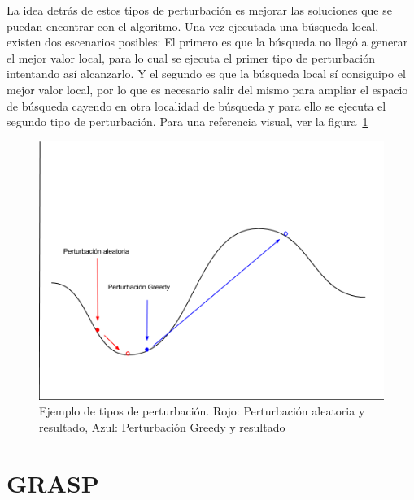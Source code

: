 \documentclass{ci5652}
\begin{document}
La idea detrás de estos tipos de perturbación es mejorar las soluciones que se puedan encontrar con el algoritmo. Una vez ejecutada una búsqueda local, existen dos escenarios posibles: El primero es que la búsqueda no llegó a generar el mejor valor local, para lo cual se ejecuta el primer tipo de perturbación intentando así alcanzarlo. Y el segundo es que la búsqueda local sí consiguipo el mejor valor local, por lo que es necesario salir del mismo para ampliar el espacio de búsqueda cayendo en otra localidad de búsqueda y para ello se ejecuta el segundo tipo de perturbación. Para una referencia visual, ver la figura~\ref{fig:perturbaciones}

\begin{figure}[h!]
	\centering
	\includegraphics[width=\linewidth]{perturbaciones}
	\caption{Ejemplo de tipos de perturbación. Rojo: Perturbación aleatoria y resultado, Azul: Perturbación Greedy y resultado}
	\label{fig:perturbaciones}
\end{figure}
\section{GRASP}

\small




\end{document}
